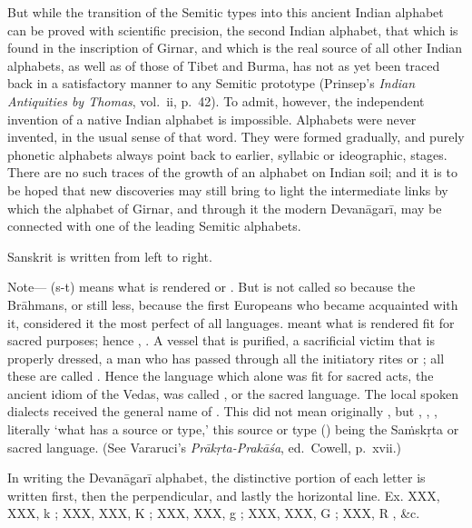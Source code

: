 \begin{note}
  But while the transition of the Semitic types into this ancient Indian
  alphabet can be proved with scientific precision, the second Indian
  alphabet, that which is found in the inscription of Girnar, and which
  is the real source of all other Indian alphabets, as well as of those
  of Tibet and Burma, has not as yet been traced back in a satisfactory
  manner to any Semitic prototype (Prinsep's \emph{Indian Antiquities by
  Thomas}, vol.\ ii, p.\ 42). To admit, however, the independent
  invention of a native Indian alphabet is impossible. Alphabets were
  never invented, in the usual sense of that word. They were formed
  gradually, and purely phonetic alphabets always point back to earlier,
  syllabic or ideographic, stages. There are no such traces of the
  growth of an alphabet on Indian soil; and it is to be hoped that new
  discoveries may still bring to light the intermediate links by which
  the alphabet of Girnar, and through it the modern Devanāgarī, may be
  connected with one of the leading Semitic alphabets.
\end{note}

\s Sanskrit is written from left to right.

\begin{note}
  Note— ({\dn s\2-t}) means what is rendered  or
  . But  is not called so because the
  Brāhmans, or still less, because the first Europeans who became
  acquainted with it, considered it the most perfect of all languages.
   meant what is rendered fit for sacred purposes; hence
  , . A vessel that is purified, a sacrificial
  victim that is properly dressed, a man who has passed through all the
  initiatory rites or ; all these are called
  . Hence the language which alone was fit for sacred acts,
  the ancient idiom of the Vedas, was called , or the
  sacred language. The local spoken dialects received the general name
  of . This did not mean originally , but
  , , , literally `what has
  a source or type,' this source or type () being the
  Saṁskṛta or sacred language. (See Vararuci's \emph{Prākṛta-Prakāśa},
  ed.\ Cowell, p.\ xvii.)
\end{note}

\s In writing the Devanāgarī alphabet, the distinctive portion of each
letter is written first, then the perpendicular, and lastly the
horizontal line. Ex. XXX, XXX, {\dn k} ; XXX, XXX, {\dn K} ;
XXX, XXX, {\dn g} ; XXX, XXX, {\dn G} ; XXX, {\dn R} , \&c.


